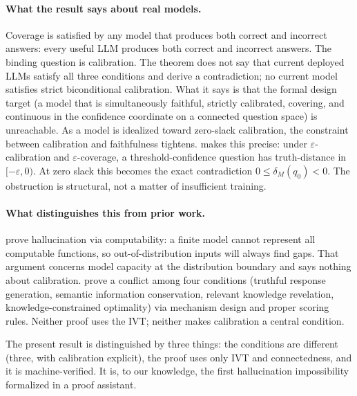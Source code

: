 \documentclass[10pt]{article}
\begin{document}
\paragraph{What the result says about real models.}
Coverage is satisfied by any model that produces both correct and incorrect answers: every useful LLM
produces both correct and incorrect answers. The binding question is
calibration. The theorem does not say that current deployed LLMs satisfy
all three conditions and derive a contradiction; no current model
satisfies strict biconditional calibration. What it says is that the
formal design target (a model that is simultaneously faithful, strictly
calibrated, covering, and continuous in the confidence coordinate on a
connected question space) is unreachable. As a model is idealized toward
zero-slack calibration, the constraint between calibration and faithfulness
tightens.  makes this precise: under
$\varepsilon$-calibration and $\varepsilon$-coverage, a threshold-confidence
question has truth-distance in $[-\varepsilon,0)$. At zero slack this becomes
the exact contradiction $0 \leq \delta_M(q_0) < 0$.
The obstruction is structural, not a matter of insufficient training.

\paragraph{What distinguishes this from prior work.}
\citet{xu2024hallucination} prove hallucination via computability: a finite
model cannot represent all computable functions, so out-of-distribution
inputs will always find gaps. That argument concerns model capacity at the
distribution boundary and says nothing about calibration.
\citet{karpowicz2025impossibility} prove a conflict among four conditions
(truthful response generation, semantic information conservation, relevant
knowledge revelation, knowledge-constrained optimality) via mechanism design
and proper scoring rules. Neither proof uses the IVT; neither makes
calibration a central condition.

The present result is distinguished by three things: the conditions are
different (three, with calibration explicit), the proof uses only IVT and
connectedness, and it is machine-verified. It is, to our knowledge, the
first hallucination impossibility formalized in a proof assistant.
\end{document}
